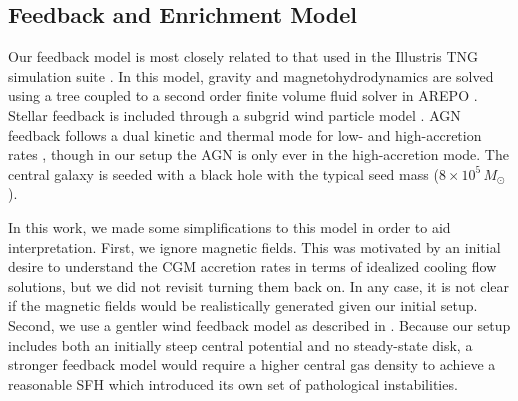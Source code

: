 \documentclass[linenumbers, twocolumn]{aastex631}
\newcommand{\Msun}{\ensuremath{M_{\odot}}}
\begin{document}
\subsection{Feedback and Enrichment Model}\label{ssec:gfm}
Our feedback model is most closely related to that used in the Illustris TNG simulation suite \citep{2013MNRAS.436.3031V,2017MNRAS.465.3291W,2018MNRAS.473.4077P}. In this model, gravity and magnetohydrodynamics are solved using a \citet{1986Natur.324..446B} tree coupled to a second order finite volume fluid solver in AREPO \citep{2010MNRAS.401..791S,2016MNRAS.455.1134P}. Stellar feedback is included through a subgrid wind particle model \citep{2003MNRAS.339..289S}. AGN feedback follows a dual kinetic and thermal mode for low- and high-accretion rates \citep{2017MNRAS.465.3291W}, though in our setup the AGN is only ever in the high-accretion mode. The central galaxy is seeded with a black hole with the typical seed mass ($8\times10^5\,\Msun$). 

In this work, we made some simplifications to this model in order to aid interpretation. First, we ignore magnetic fields. This was motivated by an initial desire to understand the CGM accretion rates in terms of idealized cooling flow solutions, but we did not revisit turning them back on. In any case, it is not clear if the magnetic fields would be realistically generated given our initial setup. Second, we use a gentler wind feedback model as described in \citet{2019MNRAS.489.4233M}. Because our setup includes both an initially steep central potential and no steady-state disk, a stronger feedback model would require a higher central gas density to achieve a reasonable SFH which introduced its own set of pathological instabilities.
\end{document}
